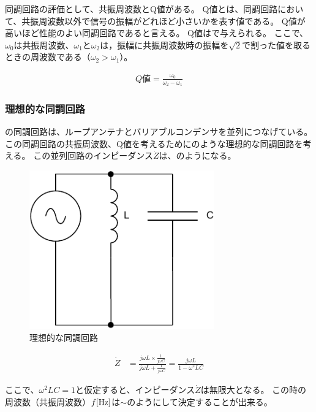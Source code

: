 \documentclass[report.tex]{subfiles}
\begin{document}
同調回路の評価として、共振周波数とQ値がある。
Q値とは、同調回路において、共振周波数以外で信号の振幅がどれほど小さいかを表す値である。
Q値が高いほど性能のよい同調回路であると言える。
Q値はで与えられる\cite{ノート}。
ここで、\(\omega_0\)は共振周波数、\(\omega_1\)と\(\omega_2\)は，振幅に共振周波数時の振幅を\(\sqrt{2}\)で割った値を取るときの周波数である（\(\omega_2 > \omega_1\)）。

\begin{align}
	Q値 =\frac{\omega_0}{\omega_2 - \omega_1} \label{eq:Q値}
\end{align}

\subsubsection{理想的な同調回路}

の同調回路は、ループアンテナとバリアブルコンデンサを並列につなげている。
この同調回路の共振周波数、Q値を考えるためにのような理想的な同調回路を考える。
この並列回路のインピーダンス\(\dot{Z}\)は、のようになる。

\begin{figure}[H]
	\centering
	\includegraphics[width=8cm]{fig/kyo.pdf}
	\caption{理想的な同調回路}
	\label{fig:kyo}
\end{figure}

\begin{align}
	\dot{Z} & = \frac{j \omega L \times \frac{1}{j \omega C}}{j \omega L + \frac{1}{j \omega C}} = \frac{j \omega L}{1 - \omega^2 LC} \label{eq:impedance}
\end{align}

ここで、$\omega^2 LC = 1$と仮定すると、インピーダンス\(\dot{Z}\)は無限大となる。
この時の周波数（共振周波数）\(f\rm{[Hz]}\)は\(\sim\)のようにして決定することが出来る。
\end{document}
